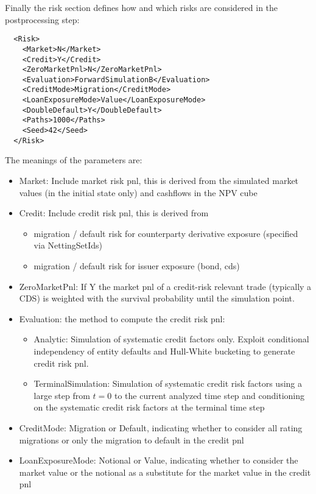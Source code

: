 \documentclass[12pt, a4paper]{article}
\begin{document}
Finally the risk section defines how and which risks are considered in the postprocessing step:

\begin{verbatim}
  <Risk>
    <Market>N</Market>
    <Credit>Y</Credit>
    <ZeroMarketPnl>N</ZeroMarketPnl>
    <Evaluation>ForwardSimulationB</Evaluation>
    <CreditMode>Migration</CreditMode>
    <LoanExposureMode>Value</LoanExposureMode>
    <DoubleDefault>Y</DoubleDefault>
    <Paths>1000</Paths>
    <Seed>42</Seed>
  </Risk>
\end{verbatim}

The meanings of the parameters are:

\begin{itemize}
\item Market: Include market risk pnl, this is derived from the simulated market values (in the initial state only) and
  cashflows in the NPV cube
\item Credit: Include credit risk pnl, this is derived from
  \begin{itemize}
    \item migration / default risk for counterparty derivative exposure (specified via NettingSetIds)
    \item migration / default risk for issuer exposure (bond, cds)
  \end{itemize}
\item ZeroMarketPnl: If Y the market pnl of a credit-risk relevant trade (typically a CDS) is weighted with the survival
  probability until the simulation point.
\item Evaluation: the method to compute the credit risk pnl:
  \begin{itemize}
  \item Analytic: Simulation of systematic credit factors only. Exploit conditional independency of entity defaults and Hull-White bucketing to generate credit risk pnl.
  \item TerminalSimulation: Simulation of systematic credit risk factors using a large step from $t=0$ to the current
    analyzed time step and conditioning on the systematic credit risk factors at the terminal time step
  \end{itemize}
\item CreditMode: Migration or Default, indicating whether to consider all rating migrations or only the migration to default in the credit pnl
\item LoanExposureMode: Notional or Value, indicating whether to consider the market value or the notional as a substitute for the market value in the credit pnl

\end{itemize}
\end{document}
